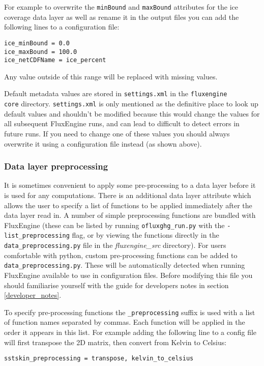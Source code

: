 \documentclass[]{scrartcl}
\begin{document}
{For example to overwrite the \texttt{minBound} and \texttt{maxBound} attributes for the ice coverage data layer as well as rename it in the output files you can add the following lines to a configuration file:
\begin{lstlisting}
ice_minBound = 0.0
ice_maxBound = 100.0
ice_netCDFName = ice_percent
\end{lstlisting}

Any value outside of this range will be replaced with missing values.

Default metadata values are stored in \texttt{settings.xml} in the \texttt{fluxengine\\core} directory. \texttt{settings.xml} is only mentioned as the definitive place to look up default values and shouldn't be modified because this would change the values for all subsequent FluxEngine runs, and can lead to difficult to detect errors in future runs. If you need to change one of these values you should always overwrite it using a configuration file instead (as shown above).

\subsubsection{Data layer preprocessing}
It is sometimes convenient to apply some pre-processing to a data layer before it is used for any computations. There is an additional data layer attribute which allows the user to specify a list of functions to be applied immediately after the data layer read in. A number of simple preprocessing functions are bundled with FluxEngine (these can be listed by running \texttt{ofluxghg\_run.py} with the \texttt{-list\_preprocessing} flag, or by viewing the functions directly in the \texttt{data\_preprocessing.py} file in the \textit{fluxengine\_src} directory). For users comfortable with python, custom pre-processing functions can be added to \texttt{data\_preprocessing.py}. These will be automatically detected when running FluxEngine available to use in configuration files. Before modifying this file you should familiarise yourself with the guide for developers notes in section \ref{developer_notes}.

To specify pre-processing functions the \texttt{\_preprocessing} suffix is used with a list of function names separated by commas. Each function will be applied in the order it appears in this list. For example adding the following line to a config file will first transpose the 2D matrix, then convert from Kelvin to Celsius:
\begin{lstlisting}
sstskin_preprocessing = transpose, kelvin_to_celsius
\end{lstlisting}

}
\end{document}
